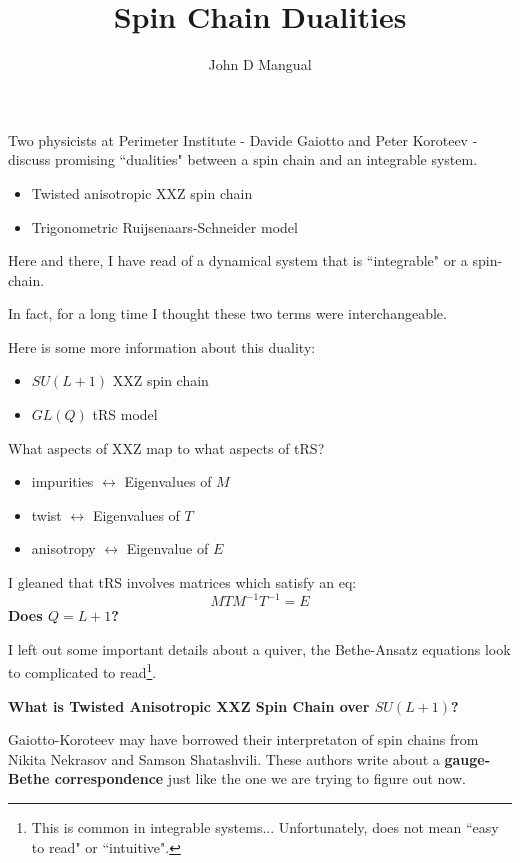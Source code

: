 \documentclass[12pt]{article}
\title{\textbf{Spin Chain Dualities}}
\author{John D Mangual}
\date{}
\begin{document}
\selectfont \fontsize{25}{30}\selectfont

\maketitle

\noindent Two physicists at Perimeter Institute - Davide Gaiotto and Peter Koroteev - discuss promising ``dualities" between a spin chain and an integrable system.
\begin{itemize}
\item Twisted anisotropic XXZ spin chain
\item Trigonometric Ruijsenaars-Schneider model
\end{itemize}
Here and there, I have read of a dynamical system that is ``integrable" or a spin-chain. \newline

\noindent In fact, for a long time I thought these two terms were interchangeable.

\newpage

\noindent Here is some more information about this duality:
\begin{itemize}
\item $SU(L+1)$ XXZ spin chain
\item $GL(Q)$ tRS model
\end{itemize}
What aspects of XXZ map to what aspects of tRS?
\begin{itemize}
\item impurities $\longleftrightarrow$ Eigenvalues of $M$
\item twist $\longleftrightarrow$ Eigenvalues of $T$
\item anisotropy $\longleftrightarrow$ Eigenvalue of $E$
\end{itemize}
I gleaned that tRS involves matrices which satisfy an eq:
$$ MTM^{-1}T^{-1} = E$$
\textbf{Does $Q = L+1$? } \newline

\noindent I left out some important details about a quiver, the Bethe-Ansatz equations look to complicated to read\footnote{This is common in integrable systems... Unfortunately, does not mean ``easy to read" or ``intuitive".}.


\newpage

\noindent \textbf{What is Twisted Anisotropic XXZ Spin Chain over $SU(L+1)$?} \newline

\noindent Gaiotto-Koroteev may have borrowed their interpretaton of spin chains from Nikita Nekrasov and Samson Shatashvili.  These authors write about a \textbf{gauge-Bethe correspondence} just like the one we are trying to figure out now. \newline
\end{document}
